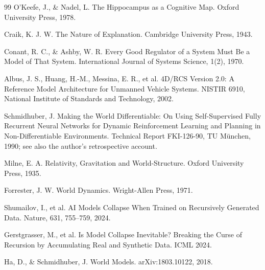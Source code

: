 \documentclass[10pt]{article}
\begin{document}
\begin{thebibliography}{99}
O'Keefe, J., \& Nadel, L. The Hippocampus as a Cognitive Map. Oxford University Press, 1978.

Craik, K. J. W. The Nature of Explanation. Cambridge University Press, 1943.

Conant, R. C., \& Ashby, W. R. Every Good Regulator of a System Must Be a Model of That System. International Journal of Systems Science, 1(2), 1970.

Albus, J. S., Huang, H.-M., Messina, E. R., et al. 4D/RCS Version 2.0: A Reference Model Architecture for Unmanned Vehicle Systems. NISTIR 6910, National Institute of Standards and Technology, 2002.

Schmidhuber, J. Making the World Differentiable: On Using Self-Supervised Fully Recurrent Neural Networks for Dynamic Reinforcement Learning and Planning in Non-Differentiable Environments. Technical Report FKI-126-90, TU M\"unchen, 1990; see also the author's retrospective account.

Milne, E. A. Relativity, Gravitation and World-Structure. Oxford University Press, 1935.

Forrester, J. W. World Dynamics. Wright-Allen Press, 1971.

Shumailov, I., et al. AI Models Collapse When Trained on Recursively Generated Data. Nature, 631, 755--759, 2024.

Gerstgrasser, M., et al. Is Model Collapse Inevitable? Breaking the Curse of Recursion by Accumulating Real and Synthetic Data. ICML 2024.

Ha, D., \& Schmidhuber, J. World Models. arXiv:1803.10122, 2018.

\end{thebibliography}
\end{document}
